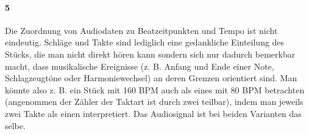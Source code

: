{	\paragraph{5}  %
	{
		Die Zuordnung von Audiodaten zu Beatzeitpunkten und Tempo ist nicht eindeutig.
		Schläge und Takte sind lediglich eine gedankliche Einteilung des Stücks,
			die man nicht direkt hören kann
			sondern sich nur dadurch bemerkbar macht,
			dass musikalische Ereignisse
			(z. B. Anfang und Ende einer Note, Schlagzeugtöne oder Harmoniewechsel)
			an deren Grenzen orientiert sind.
		Man könnte also z. B. ein Stück mit 160 BPM auch als eines mit 80 BPM betrachten
			(angenommen der Zähler der Taktart ist durch zwei teilbar),
			indem man jeweils zwei Takte als einen interpretiert.
		Das Audiosignal ist bei beiden Varianten das selbe.
	}


}
